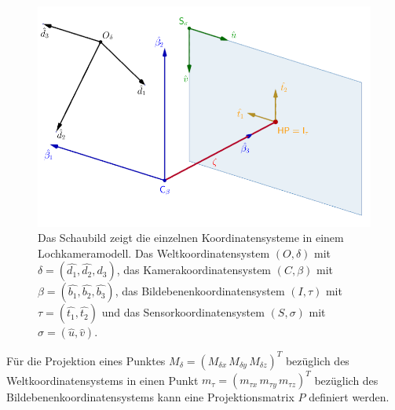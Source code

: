 \begin{figure}[!htb]
	\centering
	\includegraphics[width=0.8\linewidth]{images/UebersichtKoordinatensysteme_beschriftet.png}
	\caption[Koordinatensysteme im Überblick]{Das Schaubild zeigt die einzelnen Koordinatensysteme in einem Lochkameramodell. Das Weltkoordinatensystem $(O,\delta)$ mit $\delta = (\hat{d_1},\hat{d_2},\hat{d_3})$, das Kamerakoordinatensystem $(C,\beta)$ mit $\beta = (\hat{b_1},\hat{b_2},\hat{b_3})$, das Bildebenenkoordinatensystem $(I,\tau)$ mit $\tau = (\hat{t_1},\hat{t_2})$ und das Sensorkoordinatensystem $(S,\sigma)$ mit $\sigma = (\hat{u},\hat{v})$. }
	\label{fig:KoordinatensystemeUeberblick}
\end{figure}


Für die Projektion eines Punktes $M_\delta=({M_{\delta x}}\,{M_{\delta y}}\,{M_{\delta z}})^T$ bezüglich des Weltkoordinatensystems in einen Punkt $m_\tau=({m_{\tau x}}\,{m_{\tau y}}\,{m_{\tau z}})^T$ bezüglich des Bildebenenkoordinatensystems kann eine Projektionsmatrix $P$ definiert werden.\\

